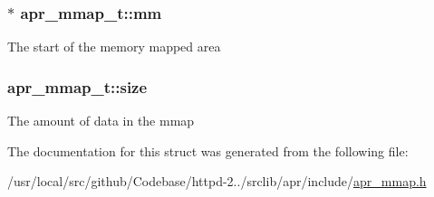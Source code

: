 \subsubsection[{\texorpdfstring{mm}{mm}}]{$\ast$ apr\+\_\+mmap\+\_\+t\+::mm}\hypertarget{structapr__mmap__t_abcc62d7e7c8187311e6619faf0d44f19}{}\label{structapr__mmap__t_abcc62d7e7c8187311e6619faf0d44f19}
The start of the memory mapped area 
\subsubsection[{\texorpdfstring{size}{size}}]{ apr\+\_\+mmap\+\_\+t\+::size}\hypertarget{structapr__mmap__t_a274aea0906a4b674e1642ac9e81966c7}{}\label{structapr__mmap__t_a274aea0906a4b674e1642ac9e81966c7}
The amount of data in the mmap 

The documentation for this struct was generated from the following file\+:\begin{DoxyCompactItemize}
\item 
/usr/local/src/github/\+Codebase/httpd-\/2../srclib/apr/include/\hyperlink{apr__mmap_8h}{apr\+\_\+mmap.\+h}\end{DoxyCompactItemize}
